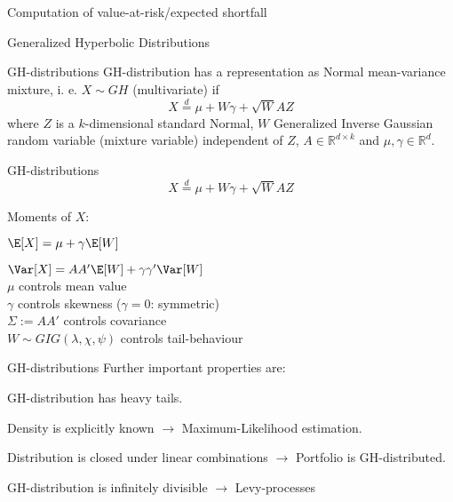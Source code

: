 	Computation of value-at-risk/expected shortfall





{Generalized Hyperbolic Distributions}

{GH-distributions} GH-distribution has a
representation as Normal mean-variance mixture, i. e. $X\sim GH$
(multivariate) if
$$X\stackrel{d}{=}\mu+W\gamma+\sqrt{W}AZ$$
where $Z$ is a $k$-dimensional standard Normal, $W$ Generalized
Inverse Gaussian random variable (mixture variable) independent of
$Z$, $A\in\mathbb{R}^{d\times k}$ and $\mu, \gamma \in
\mathbb{R}^d$.

{GH-distributions} %
$$X\stackrel{d}{=}\mu+W\gamma+\sqrt{W}AZ$$






	Moments of $X$:


	$\E[X]=\mu+\gamma\E[W]$


	$\Var[X]=AA'\E[W]+\gamma\gamma'\Var[W]$\\[-1.5cm]


	$\mu$ controls mean value\\[-1.5cm]


	$\gamma$ controls skewness ($\gamma=0$: symmetric)\\[-1.5cm]


	$\Sigma:=AA'$ controls covariance\\[-1.5cm]


	$W\sim GIG(\lambda,\chi,\psi)$ controls tail-behaviour





{GH-distributions} %
Further important properties
are: %






	GH-distribution has heavy tails.

	Density is explicitly
known $\rightarrow$ Maximum-Likelihood estimation.

	
Distribution is closed under linear combinations $\rightarrow$
Portfolio is GH-distributed.

	GH-distribution is infinitely
divisible $\rightarrow$ Levy-processes


